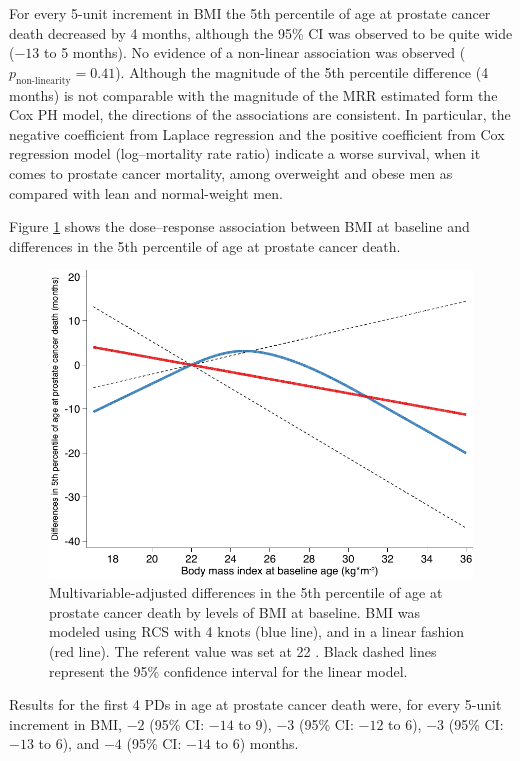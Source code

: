 For every 5-unit increment in BMI the 5th percentile of age at prostate cancer death decreased by 4 months, although the 95\% CI was observed to be quite wide ($-13$ to 5 months). No evidence of a non-linear association was observed ($p_{\textrm{non-linearity}}=0.41$). Although the magnitude of the 5th percentile difference (4 months) is not comparable with the magnitude of the MRR estimated form the Cox PH model, the directions of the associations are consistent. In particular, the negative coefficient from Laplace regression and the positive coefficient from Cox regression model (log--mortality rate ratio) indicate a worse survival, when it comes to prostate cancer mortality, among overweight and obese men as compared with lean and normal-weight men. 

Figure \ref{fig:fpc5} shows the dose--response association between BMI at baseline and differences in the 5th percentile of age at prostate cancer death.

\begin{figure}[h]
\centering
\includegraphics[width=.8\linewidth]{figures/fpc5.pdf}
\caption[Differences in the 5th percentile of age at prostate cancer death by levels of BMI at baseline]{Multivariable-adjusted differences in the 5th percentile of age at prostate cancer death by levels of BMI at baseline. BMI was modeled using RCS with 4 knots (blue line), and in a linear fashion (red line). The referent value was set at 22 \kgmsq. Black dashed lines represent the 95\% confidence interval for the linear model.}
\label{fig:fpc5}
\end{figure}

Results for the first 4 PDs in age at prostate cancer death were, for every 5-unit increment in BMI, $-2$ (95\% CI: $-14$ to 9), $-3$ (95\% CI: $-12$ to 6), $-3$ (95\% CI: $-13$ to 6), and $-4$ (95\% CI: $-14$ to 6) months. 



